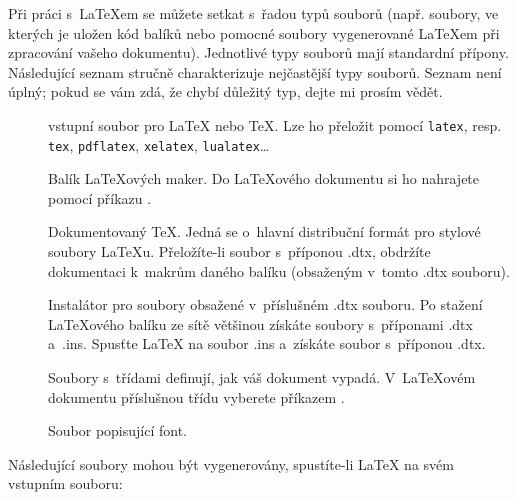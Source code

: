 Při práci s~\LaTeX em se můžete setkat s~řadou typů souborů
(např. soubory, ve kterých je uložen kód balíků nebo pomocné soubory
vygenerované \LaTeX em při zpracování vašeho dokumentu). Jednotlivé
typy souborů mají standardní přípony. Následující seznam stručně
charakterizuje nejčastější typy souborů. Seznam není úplný;
pokud se vám zdá, že chybí důležitý typ, dejte mi prosím vědět.

\begin{description}
  
\item[] vstupní soubor pro \LaTeX{} nebo \TeX. Lze ho přeložit
  pomocí \texttt{latex}, resp. \texttt{tex}, \texttt{pdflatex}, \texttt{xelatex}, \texttt{lualatex}\ldots
\item[] Balík \LaTeX ových maker. Do \LaTeX ového dokumentu si ho
  nahrajete pomocí příkazu .
\item[] Dokumentovaný \TeX{}. Jedná se o~hlavní distribuční
  formát pro stylové soubory \LaTeX u. Přeložíte-li soubor s~příponou
  .dtx, obdržíte dokumentaci k~makrům daného balíku (obsaženým v~tomto
  .dtx souboru).
\item[] Instalátor pro soubory obsažené v~příslušném .dtx souboru.
  Po stažení \LaTeX ového balíku ze sítě většinou získáte soubory
  s~příponami .dtx a~.ins. Spusťte \LaTeX{} na soubor .ins a~získáte
  soubor s~příponou .dtx.
\item[] Soubory s~třídami definují, jak váš dokument vypadá.
  V~\LaTeX ovém dokumentu příslušnou třídu vyberete příkazem
  .
\item[] Soubor popisující font.
\end{description}
Následující soubory mohou být vygenerovány, spustíte-li \LaTeX{} na
svém vstupním souboru:

